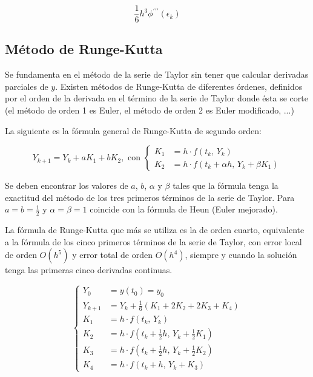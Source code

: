 \documentclass{article}
\begin{document}
\[
    \frac{1}{6} h^3\phi^{\prime\prime\prime} (\epsilon_k)
\]

\subsection{Método de Runge-Kutta}

Se fundamenta en el método de la serie de Taylor sin tener que calcular 
derivadas parciales de $y$. Existen métodos de Runge-Kutta de diferentes 
órdenes, definidos por el orden de la derivada en el término de la serie de 
Taylor donde ésta se corte (el método de orden 1 es Euler, el método de orden 2
es Euler modificado, ...)

La siguiente es la fórmula general de Runge-Kutta de segundo orden:

\begin{equation*}
    Y_{k+1} = Y_k + aK_1 + bK_2,\text{ con }
    \begin{cases}
        K_1 &= h\cdot f(t_k,\,Y_k) \\
        K_2 &= h\cdot f(t_k + \alpha h,\, Y_k + \beta K_1)
    \end{cases}
\end{equation*}

Se deben encontrar los valores de $a$, $b$, $\alpha$ y $\beta$ tales que la 
fórmula tenga la exactitud del método de los tres primeros términos de la serie
de Taylor. Para $a=b=\frac{1}{2}$ y $\alpha = \beta = 1$ coincide con la fórmula
de Heun (Euler mejorado).

La fórmula de Runge-Kutta que más se utiliza es la de orden cuarto, equivalente
a la fórmula de los cinco primeros términos de la serie de Taylor, con error 
local de orden $O(h^5)$ y error total de orden $O(h^4)$, siempre y cuando la 
solución tenga las primeras cinco derivadas continuas.

\begin{equation*}
\begin{cases}
    Y_0 &= y(t_0) = y_0 \\
    Y_{k+1} &= Y_k + \frac{1}{6} (K_1 + 2K_2 + 2K_3 + K_4) \\
    K_1 &= h \cdot f(t_k,\, Y_k) \\
    K_2 &= h \cdot f(t_k + \frac{1}{2}h,\, Y_k + \frac{1}{2}K_1) \\
    K_3 &= h \cdot f(t_k + \frac{1}{2}h,\, Y_k + \frac{1}{2}K_2) \\
    K_4 &= h \cdot f(t_k + h,\, Y_k + K_3)
\end{cases}
\end{equation*}
\end{document}
